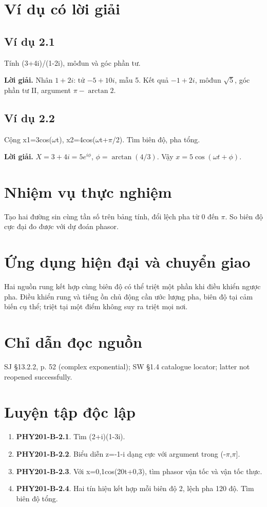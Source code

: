 \documentclass[11pt,a4paper,openany]{book}
\begin{document}
\section{Ví dụ có lời giải}
\subsection*{Ví dụ 2.1}
Tính (3+4i)/(1-2i), môđun và góc phần tư.

\textbf{Lời giải.} Nhân $1+2i$: tử $-5+10i$, mẫu 5. Kết quả $-1+2i$, môđun $\sqrt5$, góc phần tư II, argument $\pi-\arctan2$.
\subsection*{Ví dụ 2.2}
Cộng x1=3cos(\ensuremath{\omega}t), x2=4cos(\ensuremath{\omega}t+\ensuremath{\pi}/2). Tìm biên độ, pha tổng.

\textbf{Lời giải.} $X=3+4i=5e^{i\phi}$, $\phi=\arctan(4/3)$. Vậy $x=5\cos(\omega t+\phi)$.
\section{Nhiệm vụ thực nghiệm}
Tạo hai đường sin cùng tần số trên bảng tính, đổi lệch pha từ 0 đến \ensuremath{\pi}. So biên độ cực đại đo được với dự đoán phasor.
\section{Ứng dụng hiện đại và chuyển giao}
Hai nguồn rung kết hợp cùng biên độ có thể triệt một phần khi điều khiển ngược pha. Điều khiển rung và tiếng ồn chủ động cần ước lượng pha, biên độ tại cảm biến cụ thể; triệt tại một điểm không suy ra triệt mọi nơi.
\section{Chỉ dẫn đọc nguồn}
SJ §13.2.2, p. 52 (complex exponential); SW §1.4 catalogue locator; latter not reopened successfully.
\section{Luyện tập độc lập}
\begin{enumerate}
\item \textbf{PHY201-B-2.1}. Tìm (2+i)(1-3i).
\item \textbf{PHY201-B-2.2}. Biểu diễn z=-1-i dạng cực với argument trong (-\ensuremath{\pi},\ensuremath{\pi}].
\item \textbf{PHY201-B-2.3}. Với x=0,1cos(20t+0,3), tìm phasor vận tốc và vận tốc thực.
\item \textbf{PHY201-B-2.4}. Hai tín hiệu kết hợp mỗi biên độ 2, lệch pha 120 độ. Tìm biên độ tổng.
\end{enumerate}
\end{document}
